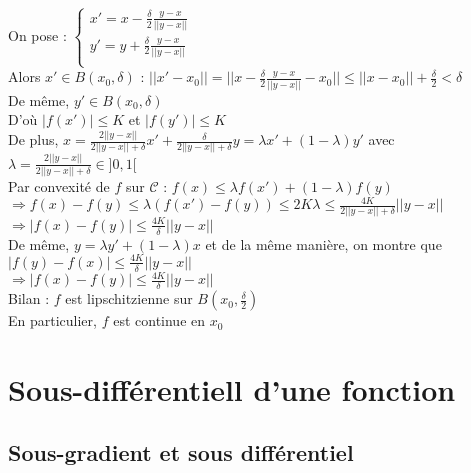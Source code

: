 \documentclass[12pt,a4paper]{article}
\begin{document}
On pose :
$\begin{cases}
    x' = x - \frac{\delta}{2} \frac{y - x}{||y - x||}\\
    y' = y + \frac{\delta}{2} \frac{y - x}{||y - x||}\\
\end{cases}$\\

Alors $x' \in B(x_0, \delta)$ : $||x' - x_0|| = ||x - \frac{\delta}{2} \frac{y - x}{||y - x||} - x_0|| \leq ||x - x_0|| + \frac{\delta}{2} < \delta$\\
De même, $y' \in B(x_0, \delta)$\\

D'où $|f(x')| \leq K$ et $|f(y')| \leq K$\\

De plus, $x = \frac{2 ||y - x||}{2 ||y - x|| + \delta} x' + \frac{\delta}{2 ||y - x|| + \delta} y = \lambda x' + (1 - \lambda) y'$ avec $\lambda = \frac{2 ||y - x||}{2 ||y - x|| + \delta} \in ]0, 1[$\\

Par convexité de $f$ sur $\mathcal{C}$ : $f(x) \leq \lambda f(x') + (1 - \lambda) f(y)$\\
$\Rightarrow f(x) - f(y) \leq \lambda (f(x') - f(y)) \leq 2K\lambda \leq \frac{4K}{2 ||y - x|| + \delta} ||y - x||$\\
$\Rightarrow |f(x) - f(y)| \leq \frac{4K}{\delta} ||y - x||$\\

De même, $y = \lambda y' + (1 - \lambda) x$ et de la même manière, on montre que $|f(y) - f(x)| \leq \frac{4K}{\delta} ||y - x||$\\
$\Rightarrow |f(x) - f(y)| \leq \frac{4K}{\delta} ||y - x||$\\

Bilan : $f$ est lipschitzienne sur $B(x_0, \frac{\delta}{2})$\\
En particulier, $f$ est continue en $x_0$\\



\section{Sous-différentiell d'une fonction}

\subsection{Sous-gradient et sous différentiel}
\end{document}

